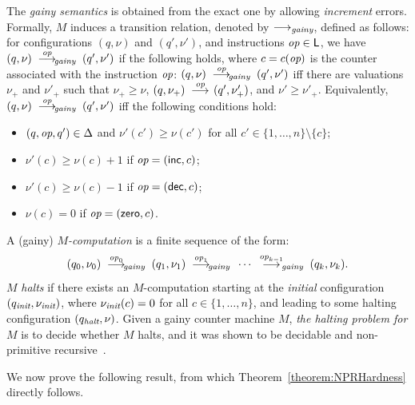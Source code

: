 %

The \emph{gainy semantics} is obtained from the exact one by allowing \emph{increment} errors.
Formally, %
$M$  induces a transition relation, denoted by $\longrightarrow_{\textit{gainy}}$, defined as follows:
for configurations $(q,\nu)$ and $(q',\nu')$, and instructions ${\textit{op}} \in \mathsf{L}$, we have $(q,\nu) \;\;{\mathop{{ \longrightarrow}}\limits^{{{\textit{op}}}}}\!_{\textit{gainy}}\;\; (q',\nu')$ if the following holds, where $c=c({\textit{op}})$ is the counter associated with the instruction
${\textit{op}}$:
$(q,\nu) \;\;{\mathop{{ \longrightarrow}}\limits^{{{\textit{op}}}}}\!_{\textit{gainy}}\;\; (q',\nu')$ iff there are valuations $\nu_+$ and $\nu'_+$ such that
$\nu_+ \geq \nu$, $(q,\nu_+) \;\;{\mathop{{ \longrightarrow}}\limits^{{{\textit{op}}}}}\!\;\; (q',\nu'_+)$, and $\nu' \geq \nu'_+$. Equivalently, $(q,\nu) \;\;{\mathop{{ \longrightarrow}}\limits^{{{\textit{op}}}}}\!_{\textit{gainy}}\;\; (q',\nu')$ iff
the following conditions hold: %
%
\begin{itemize}
  \item  $(q,{\textit{op}},q')\in \Delta$ and $\nu'(c')\geq  \nu(c')$ for all $c'\in \{1,\ldots,n\}\setminus\{c\}$;
  \item  $\nu'(c)\geq  \nu(c) +1$ if ${\textit{op}}=({\mathsf{inc}},c)$;
  \item $\nu'(c)\geq  \nu(c) -1$ if ${\textit{op}}=({\mathsf{dec}},c)$;
   \item  $\nu(c)=0$ if ${\textit{op}}=({\mathsf{zero}},c)$.
\end{itemize}%
%
%


A (gainy) \emph{$M$-computation} is a finite sequence of the form:
%
\[
(q_0,\nu_0) \;\;{\mathop{{ \longrightarrow}}\limits^{{{\textit{op}}_0}}}\!_{\textit{gainy}}\;\; (q_1,\nu_1) \;\;{\mathop{{ \longrightarrow}}\limits^{{{\textit{op}}_1}}}\!_{\textit{gainy}}\;\; \cdots  \;\;{\mathop{{ \longrightarrow}}\limits^{{{\textit{op}}_{k-1}}}}\!_{\textit{gainy}}\;\; (q_k,\nu_k).
\]
%
$M$ \emph{halts} if there exists an $M$-computation starting at the \emph{initial} configuration $(q_{\textit{init}}, \nu_{\textit{init}})$, where $\nu_{\textit{init}}(c) = 0$ for all $c\in \{1,\ldots,n\}$, and leading to some
halting configuration
$(q_{{\textit{halt}}}, \nu)$. 
Given a gainy counter machine $M$,
\emph{the halting problem for $M$} is to decide whether $M$ halts, and it was shown to be decidable and non-primitive recursive~\cite{DemriL09}.

We now prove the following result, from which Theorem~\ref{theorem:NPRHardness} directly follows.

